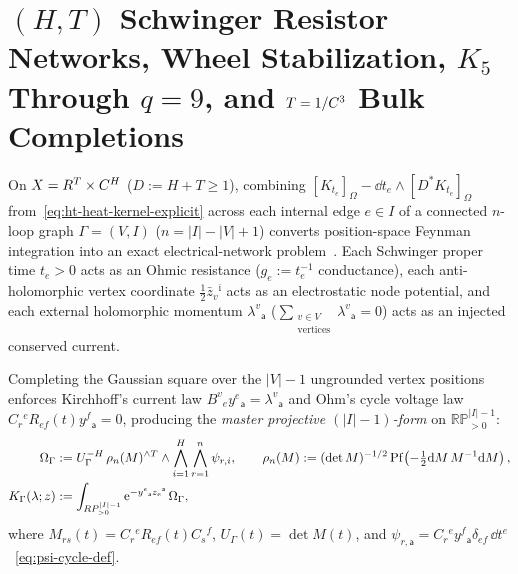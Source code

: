 \section{\texorpdfstring{$(H,T)$}{(H,T)} Schwinger Resistor Networks, Wheel Stabilization, \texorpdfstring{$K_5$}{K\_5} Through \texorpdfstring{$q=9$}{q=9}, and \texorpdfstring{$T=1 / C^3$}{T=1 / C\^3} Bulk Completions}
\label{sec:schwinger-periods-k5}

On $X = R^T\times C^H$ ($D := H+T \ge 1$), combining $[K_{t_e}]_\Omega - \dd t_e\wedge[D^* K_{t_e}]_\Omega$ from~\eqref{eq:ht-heat-kernel-explicit} across each internal edge $e \in I$ of a connected $n$-loop graph $\Gamma = (V,I)$ ($n = |I|-|V|+1$) converts position-space Feynman integration into an exact electrical-network problem~\cite{Mathews,LLC,WW24,Repo9e833c8}. Each Schwinger proper time $t_e > 0$ acts as an Ohmic resistance ($g_e := t_e^{-1}$ conductance), each anti-holomorphic vertex coordinate $\frac{1}{2}\bar{z}_v{}^{\bar{\imath}}$ acts as an electrostatic node potential, and each external holomorphic momentum $\lambda^v{}_{\mathsf{a}}$ ($\sum_{\substack{v\in V\\\mathrm{vertices}}}\lambda^v{}_{\mathsf{a}} = 0$) acts as an injected conserved current.

Completing the Gaussian square over the $|V|-1$ ungrounded vertex positions enforces Kirchhoff's current law $B^v{}_e y^e{}_{\mathsf{a}} = \lambda^v{}_{\mathsf{a}}$ and Ohm's cycle voltage law $C_r{}^e R_{ef}(t)y^f{}_{\mathsf{a}} = 0$, producing the \emph{master projective $(|I|-1)$-form} on $\mathbb{RP}^{|I|-1}_{>0}$:
\begin{equation}
\label{eq:master-omega-gamma}
\begin{aligned}
\Omega_\Gamma &:= U_\Gamma^{-H}\,\rho_n(M)^{\wedge T}\wedge\bigwedge_{i=1}^H\bigwedge_{r=1}^n\psi_{r,i},\qquad
\rho_n(M) := (\det M)^{-1/2}\operatorname{Pf}\!\left(-\tfrac{1}{2}\mathrm{d} M\,M^{-1}\mathrm{d} M\right),\\
K_\Gamma(\lambda;z) &:= \int_{RP^{|I|-1}_{>0}}\mathrm{e}^{-y^e{}_{\mathsf{a}}z_e{}^{\mathsf{a}}}\,\Omega_\Gamma,
\end{aligned}
\end{equation}
where $M_{rs}(t) = C_r{}^e R_{ef}(t)C_s{}^f$, $U_\Gamma(t) = \det M(t)$, and $\psi_{r,\mathsf{a}} = C_r{}^e y^f{}_{\mathsf{a}}\delta_{ef}\,\dd t^e$~\eqref{eq:psi-cycle-def}.

